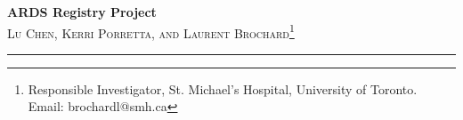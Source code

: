 \documentclass[11pt]{article} %
\begin{document}
\begin{center}
\textbf{\LARGE ARDS Registry Project\\[0.2cm]}
\textsc{Lu Chen, Kerri Porretta, and Laurent Brochard\footnote{Responsible Investigator, St. Michael's Hospital, University of Toronto. Email: brochardl@smh.ca} }
\end{center}
\hrule

\end{document}
